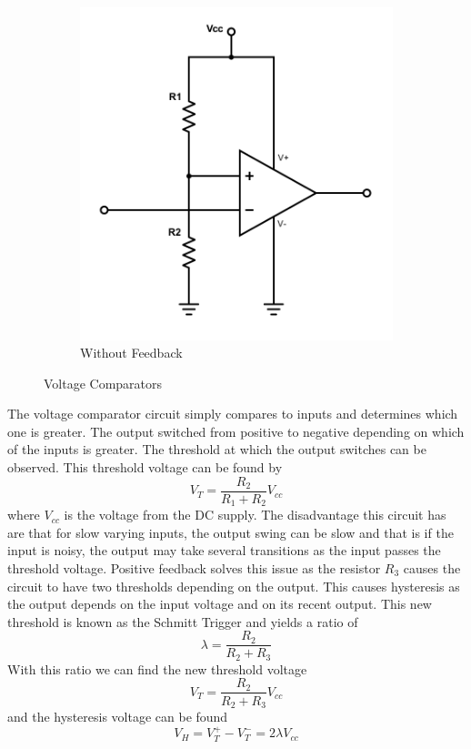 \documentclass[11pt,letterpaper,onecolumn]{article}
\begin{document}
\begin{figure}[H]
\begin{subfigure}{.5\textwidth}
  \includegraphics[scale=.5]{Lab-10-wo-feedback.pdf}
  \caption{Without Feedback}
  \label{fig:sub2}
\end{subfigure}
\caption{Voltage Comparators}
\label{fig:test}
\end{figure}

The voltage comparator circuit simply compares to inputs and determines which one is greater. The output switched from positive to negative depending on which of the inputs is greater. The threshold at which the output switches can be observed. This threshold voltage can be found by
$$V_T=\frac{R_2}{R_1 + R_2}V_{cc}$$
where $V_{cc}$ is the voltage from the DC supply. The disadvantage this circuit has are that for slow varying inputs, the output swing can be slow and that is if the input is noisy, the output may take several transitions as the input passes the threshold voltage. Positive feedback solves this issue as the resistor $R_3$ causes the circuit to have two thresholds depending on the output. This causes hysteresis as the output depends on the input voltage and on its recent output. This new threshold is known as the Schmitt Trigger and yields a ratio of 
$$ \lambda = \frac{R_2}{R_2 + R_3}$$
With this ratio we can find the new threshold voltage
$$V_T = \frac{R_2}{R_2 + R_3}V_{cc}$$
and the hysteresis voltage can be found
$$V_H = V_{T}^{+} - V_{T}^{-} = 2\lambda V_{cc}$$
\end{document}
